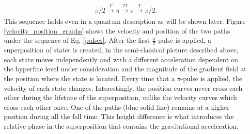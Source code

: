 \documentclass{article}
\begin{document}
\begin{equation}\label{pulses}
\pi/2 \xrightarrow[]{T} \pi \xrightarrow[]{2T} \pi \xrightarrow[]{T} \pi/2.
\end{equation}
%
This sequence holds even in a quantum description as will be shown later. Figure \ref{velocity_position_graphs} shows the velocity and position of the two paths under the sequence of Eq. \ref{pulses}. After the first $\frac{\pi}{2}$-pulse is applied, a superposition of states is created, in the semi-classical picture described above, each state moves independently and with a different acceleration dependent on the hyperfine level under consideration and the magnitude of the gradient field at the position where the state is located. Every time that a $\pi$-pulse is applied, the velocity of each state changes. Interestingly, the position curves never cross each other during the lifetime of the superposition, unlike the velocity curves which cross each other once. One of the paths (blue solid line) remains at a higher position during all the fall time. This height difference is what introduces the relative phase in the superposition that contains the gravitational acceleration.
\end{document}
